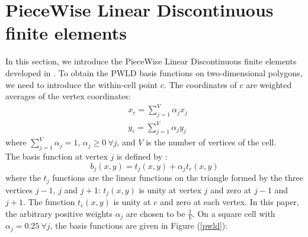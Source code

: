 \section{PieceWise Linear Discontinuous finite elements}
In this section, we introduce the PieceWise Linear Discontinuous finite
elements developed in \cite{pwld_3d,pwld_2d}. To obtain the PWLD basis
functions on two-dimensional polygons, we need to introduce the within-cell
point $c$. The coordinates of $c$ are weighted averages of the vertex coordinates:
\begin{align}
& x_c = \sum_{j=1}^{V} \alpha_{j} x_j\\
& y_c = \sum_{j=1}^{V} \alpha_{j} y_j
\end{align}
where $\sum_{j=1}^{V} \alpha_{j}=1$, $\alpha_j \geq 0\ \forall j$, and $V$ is 
the number of vertices of the cell.\\
The basis function at vertex $j$ is defined by \cite{pwld_2d}:
\begin{equation}
b_{j} (x,y) = t_{j}(x,y) + \alpha_j t_c(x,y)
\end{equation}
where the $t_j$ functions are the linear functions on the triangle formed
by the three vertices $j-1$, $j$ and $j+1$: $t_j (x,y)$ is unity at vertex $j$
and zero at $j-1$ and $j+1$. The function $t_c(x,y)$ is unity at $c$ 
and zero at each vertex. In this paper, the arbitrary positive weights
$\alpha_j$ are chosen to be $\frac{1}{V}$. On a square cell with 
$\alpha_{j}=0.25\ \forall j$, the basis functions are given in Figure (\ref{pwld}):
